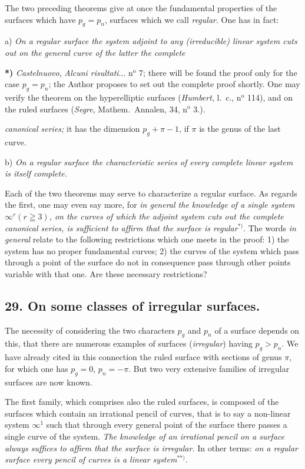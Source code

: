 \documentclass{article}
\begin{document}
The two preceding theorems give at once the fundamental properties of the surfaces which have $p_{g} = p_{n}$, surfaces which we call \emph{regular}. One has in fact:

a) \emph{On a regular surface the system adjoint to any (irreducible) linear system cuts out on the general curve of the latter the complete}

\textbf{*)} \emph{Castelnuovo}, \emph{Alcuni risultati}... n${}^{\text{o}}$ 7; there will be found the proof only for the case $p_{g} = p_{n}$; the Author proposes to set out the complete proof shortly. One may verify the theorem on the hyperelliptic surfaces (\emph{Humbert}, l.\ c., n${}^{\text{o}}$ 114), and on the ruled surfaces (\emph{Segre}, Mathem.\ Annalen, 34, n${}^{\text{o}}$ 3.).

\emph{canonical series;} it has the dimension $p_{g} + \pi - 1$, if $\pi$ is the genus of the last curve.

b) \emph{On a regular surface the characteristic series of every complete linear system is itself complete.}

Each of the two theorems may serve to characterize a regular surface. As regards the first, one may even say more, for \emph{in general the knowledge of a single system $\infty^{r} (r \geqq 3)$, on the curves of which the adjoint system cuts out the complete canonical series, is sufficient to affirm that the surface is regular}${}^{*)}$. The words \emph{in general} relate to the following restrictions which one meets in the proof: 1) the system has no proper fundamental curves; 2) the curves of the system which pass through a point of the surface do not in consequence pass through other points variable with that one. Are these necessary restrictions?

\subsection*{29. On some classes of irregular surfaces.}

The necessity of considering the two characters $p_{g}$ and $p_{n}$ of a surface depends on this, that there are numerous examples of surfaces (\emph{irregular}) having $p_{g} > p_{n}$. We have already cited in this connection the ruled surface with sections of genus $\pi$, for which one has $p_{g} = 0$, $p_{n} = -\pi$. But two very extensive families of irregular surfaces are now known.

The first family, which comprises also the ruled surfaces, is composed of the surfaces which contain an irrational pencil of curves, that is to say a non-linear system $\infty^{1}$ such that through every general point of the surface there passes a single curve of the system. \emph{The knowledge of an irrational pencil on a surface always suffices to affirm that the surface is irregular.} In other terms: \emph{on a regular surface every pencil of curves is a linear system}${}^{**)}$.
\end{document}
